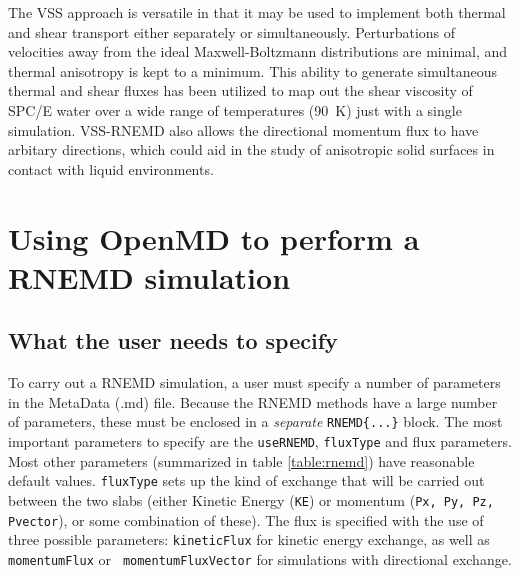 \documentclass[]{book}
\begin{document}
The VSS approach is versatile in that it may be used to implement both
thermal and shear transport either separately or simultaneously.
Perturbations of velocities away from the ideal Maxwell-Boltzmann
distributions are minimal, and thermal anisotropy is kept to a
minimum.  This ability to generate simultaneous thermal and shear
fluxes has been utilized to map out the shear viscosity of SPC/E water
over a wide range of temperatures (90~K) just with a single simulation.
VSS-RNEMD also allows the directional momentum flux to have
arbitary directions, which could aid in the study of anisotropic solid
surfaces in contact with liquid environments.

\section{\label{section:usingRNEMD}Using OpenMD to perform a RNEMD simulation}
\subsection{\label{section:rnemdParams} What the user needs to specify}
To carry out a RNEMD simulation,
a user must specify a number of parameters in the MetaData (.md) file.
Because the RNEMD methods have a large number of parameters, these
must be enclosed in a {\it separate} {\tt RNEMD\{...\}} block.  The most important
parameters to specify are the {\tt useRNEMD}, {\tt fluxType} and flux
parameters. Most other parameters (summarized in table
\ref{table:rnemd}) have reasonable default values.  {\tt fluxType}
sets up the kind of exchange that will be carried out between the two
slabs (either Kinetic Energy ({\tt KE}) or momentum ({\tt Px, Py, Pz,
  Pvector}), or some combination of these).  The flux is specified
with the use of three possible parameters: {\tt kineticFlux} for
kinetic energy exchange, as well as {\tt momentumFlux} or {\tt
  momentumFluxVector} for simulations with directional exchange.
\end{document}
